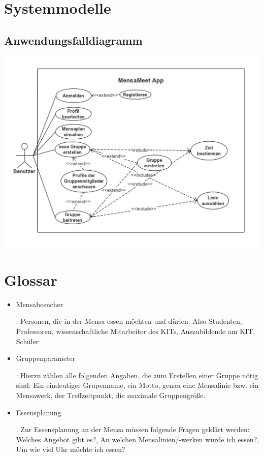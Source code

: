 \documentclass[a4paper]{scrreprt}
\begin{document}
\chapter{Systemmodelle}
\section{Anwendungsfalldiagramm}	

\begin{center}
	\includegraphics[scale=0.5]{useCase_MensaMeet.jpg}
\end{center}

\chapter{Glossar}
 \begin{itemize}
 \item \hypertarget{label1}{Mensabesucher}: Personen, die in der Mensa essen möchten und dürfen. Also Studenten, Professoren, wissenschaftliche Mitarbeiter des KITs, Auszubildende am KIT, Schüler
 \item \hypertarget{label2}{Gruppenparameter}: Hierzu zählen alle folgenden Angaben, die zum Erstellen einer Gruppe nötig sind: Ein eindeutiger Grupenname, ein Motto, genau eine Mensalinie bzw. ein Mensawerk, der Treffzeitpunkt, die maximale Gruppengröße.
\item \hypertarget{label3}{Essensplanung}: Zur Essensplanung an der Mensa müssen folgende Fragen geklärt werden: Welches Angebot gibt es?, An welchen Mensalinien/-werken würde ich essen?, Um wie viel Uhr möchte ich essen? 
  
 \end{itemize}
 
\end{document}
